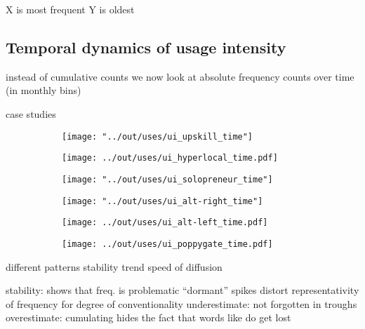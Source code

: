 \documentclass[draft, a4paper, abstract=on]{scrartcl}
\begin{document}
  X is most frequent
  Y is oldest

  \subsection{Temporal dynamics of usage intensity}

  instead of cumulative counts we now look at absolute frequency counts over time (in monthly bins)

  case studies

  \begin{figure}
  \caption{Temporal dynamics in usage frequency for case studies.}
  \centering
  \begin{subfigure}{.3\linewidth}
  \caption{}
  \texttt{[image: "../out/uses/ui\_upskill\_time"]}
  \end{subfigure}
  \begin{subfigure}{.3\linewidth}
  \caption{}
  \texttt{[image: ../out/uses/ui\_hyperlocal\_time.pdf]}
  \end{subfigure}
  \begin{subfigure}{.3\linewidth}
  \caption{}
  \texttt{[image: "../out/uses/ui\_solopreneur\_time"]}
  \end{subfigure}

  \begin{subfigure}{.3\linewidth}
  \caption{}
  \texttt{[image: "../out/uses/ui\_alt-right\_time"]}
  \end{subfigure}
  \begin{subfigure}{.3\linewidth}
  \caption{}
  \texttt{[image: ../out/uses/ui\_alt-left\_time.pdf]}
  \end{subfigure}
  \begin{subfigure}{.3\linewidth}
  \caption{}
  \texttt{[image: ../out/uses/ui\_poppygate\_time.pdf]}
  \end{subfigure}
  \end{figure}

  different patterns
  stability
  trend
  speed of diffusion

  stability: shows that freq. is problematic
  \enquote{dormant}
  spikes distort representativity of frequency for degree of conventionality
  underestimate:  not forgotten in troughs
  overestimate: cumulating hides the fact that words like  do get lost
\end{document}
